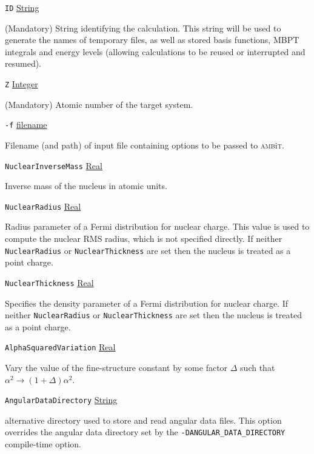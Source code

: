 \documentclass{report}
\newcommand{\ambit}{\textsc{amb}{\footnotesize i}\textsc{t}}
\begin{document}
\texttt{ID} \uline{String}
\begin{adjustwidth}{1cm}{}
(Mandatory) String identifying the calculation. This string will be used to generate the names of 
temporary files, as well as stored basis functions, MBPT integrals and energy levels 
(allowing calculations to be reused or interrupted and resumed).
\end{adjustwidth}

\texttt{Z} \uline{Integer}
\begin{adjustwidth}{1cm}{}
(Mandatory) Atomic number of the target system. 
\end{adjustwidth}

\texttt{-f} \uline{filename}
\begin{adjustwidth}{1cm}{}
Filename (and path) of input file containing options to be passed to \ambit. 
\end{adjustwidth}

\texttt{NuclearInverseMass} \uline{Real}
\begin{adjustwidth}{1cm}{}
Inverse mass of the nucleus in atomic units.
\end{adjustwidth}

\texttt{NuclearRadius} \uline{Real}
\begin{adjustwidth}{1cm}{}
Radius parameter of a Fermi distribution for nuclear charge. This value is 
used to compute the nuclear RMS radius, which is not specified directly. If neither 
\texttt{NuclearRadius} or \texttt{NuclearThickness} are set then the nucleus is treated as a point 
charge.
\end{adjustwidth}

\texttt{NuclearThickness} \uline{Real}
\begin{adjustwidth}{1cm}{}
Specifies the density parameter of a Fermi distribution for nuclear charge. 
If neither \texttt{NuclearRadius} or \texttt{NuclearThickness} are set then the nucleus is treated as a 
point charge.
\end{adjustwidth}

\texttt{AlphaSquaredVariation} \uline{Real}
\begin{adjustwidth}{1cm}{}
Vary the value of the fine-structure constant by some factor $\Delta$ such that 
$\alpha^2 \to (1 + \Delta)\alpha^2$. 
\end{adjustwidth}

\texttt{AngularDataDirectory} \uline{String}
\begin{adjustwidth}{1cm}{}
alternative directory used to store and read angular data files. This option overrides the angular data
directory set by the \texttt{-DANGULAR\_DATA\_DIRECTORY} compile-time option.
\end{adjustwidth}
\end{document}
